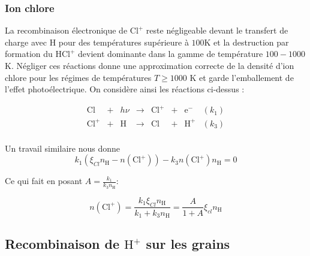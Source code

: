 

\subsubsection{Ion chlore}

La recombinaison électronique de $\mathrm{Cl}^+$ reste négligeable devant le transfert de charge avec $\mathrm{H}$ pour des températures supérieure à $100$K et la destruction par formation du $\mathrm{HCl}^+$ devient dominante dans la gamme de température $100-1000$K. Négliger ces réactions donne une approximation correcte de la densité d'ion chlore pour les régimes de températures $T\geq 1000$ K et garde l'emballement de l'effet photoélectrique. On considère ainsi les réactions ci-dessus :


\begin{equation}
    \begin{array}{lccccclr}
       \mathrm{Cl}  & + & h\nu & \rightarrow & \mathrm{Cl}^+ & + & \mathrm{e}^- & (k_1) \\
        \mathrm{Cl}^+ & + &\mathrm{H}   & \rightarrow &\mathrm{Cl}  & + & \mathrm{H}^+ & (k_3) \\
    \end{array}
\end{equation}

Un travail similaire nous donne 
\begin{equation}
    k_1(\xi_{Cl}n_{\mathrm{H}} - n(\mathrm{Cl}^+)) - k_3 n(\mathrm{Cl}^+) n_{\mathrm{H}} = 0
\end{equation}

Ce qui fait en posant $A = \frac{k_1}{k_3 n_{\mathrm{H}}}$:

\begin{equation}
\boxed{n(\mathrm{Cl}^+) = \frac{k_1 \xi_{Cl} n_{\mathrm{H}}}{k_1 + k_3 n_{\mathrm{H}}} = \frac{A}{1 + A} \xi_{cl} n_{\mathrm{H}}}
\end{equation}



\subsection{Recombinaison de $\mathrm{H}^+$ sur les grains}

